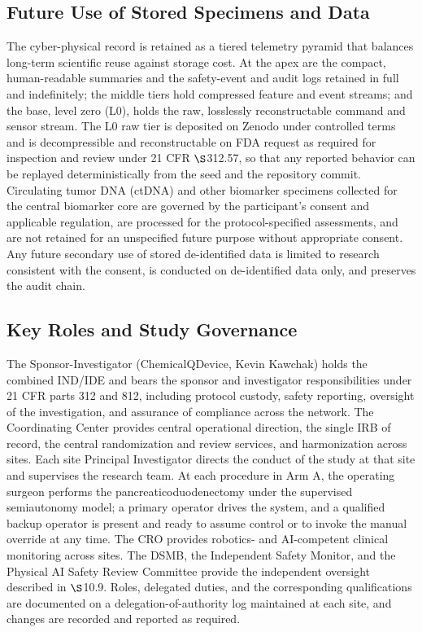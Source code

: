 \subsection{Future Use of Stored Specimens and Data}

The cyber-physical record is retained as a tiered telemetry pyramid that balances
long-term scientific reuse against storage cost. At the apex are the compact,
human-readable summaries and the safety-event and audit logs retained in full and
indefinitely; the middle tiers hold compressed feature and event streams; and the
base, level zero (L0), holds the raw, losslessly reconstructable command and sensor
stream. The L0 raw tier is deposited on Zenodo under controlled terms and is
decompressible and reconstructable on FDA request as required for inspection and
review under 21 CFR $\S$312.57, so that any reported behavior can be replayed
deterministically from the seed and the repository commit. Circulating tumor DNA
(ctDNA) and other biomarker specimens collected for the central biomarker core are
governed by the participant's consent and applicable regulation, are processed for
the protocol-specified assessments, and are not retained for an unspecified future
purpose without appropriate consent. Any future secondary use of stored
de-identified data is limited to research consistent with the consent, is conducted
on de-identified data only, and preserves the audit chain.

\subsection{Key Roles and Study Governance}

The Sponsor-Investigator (ChemicalQDevice, Kevin Kawchak) holds the combined
IND/IDE and bears the sponsor and investigator responsibilities under 21 CFR parts
312 and 812, including protocol custody, safety reporting, oversight of the
investigation, and assurance of compliance across the network. The Coordinating
Center provides central operational direction, the single IRB of record, the
central randomization and review services, and harmonization across sites. Each site
Principal Investigator directs the conduct of the study at that site and supervises
the research team. At each procedure in Arm A, the operating surgeon performs the
pancreaticoduodenectomy under the supervised semiautonomy model; a primary operator
drives the system, and a qualified backup operator is present and ready to assume
control or to invoke the manual override at any time. The CRO provides robotics- and
AI-competent clinical monitoring across sites. The DSMB, the Independent Safety
Monitor, and the Physical AI Safety Review Committee provide the independent
oversight described in $\S$10.9. Roles, delegated duties, and the corresponding
qualifications are documented on a delegation-of-authority log maintained at each
site, and changes are recorded and reported as required.

